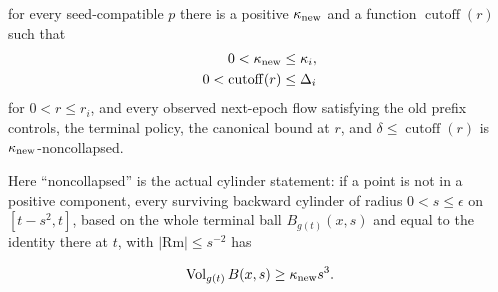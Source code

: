 \begin{theorem}
\label{thm:global-noncollapse}
for every seed-compatible $p$ there is a positive $\kappa_{\rm new}$ and a
function $\operatorname{cutoff}(r)$ such that
\begin{align*}
0<\kappa_{\rm new}&\leq\kappa_i,\\
0<\operatorname{cutoff}(r)&\leq\Delta_i
\end{align*}
for $0<r\leq r_i$, and every observed next-epoch flow satisfying the old
prefix controls, the terminal policy, the canonical bound at $r$, and
$\delta\leq\operatorname{cutoff}(r)$ is $\kappa_{\rm new}$-noncollapsed.

Here ``noncollapsed'' is the actual cylinder statement: if a point is not in
a positive component, every surviving backward cylinder of radius
$0<s\leq\epsilon$ on $[t-s^2,t]$, based on the whole terminal ball
$B_{g(t)}(x,s)$ and equal to the identity there at $t$, with
$|\mathrm{Rm}|\leq s^{-2}$ has

\begin{equation}
 \operatorname{Vol}_{g(t)}B(x,s)\geq \kappa_{\rm new}s^3.
 \label{eq:global-noncollapse}
\end{equation}
\end{theorem}

